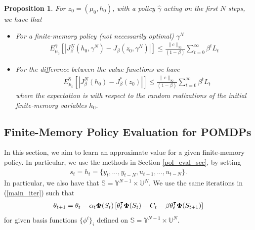 \documentclass[11pt]{article}
\newtheorem{prop}{Proposition}
\def\P{{\mathcal P}}
\begin{document}
\begin{prop}\cite[Theorem 3.3]{kara2023convergence}\label{cont_bound}
For ${z}_0=(\mu_0,h_0)$, with a policy $\hat{\gamma}$ acting on the first $N$ steps, we have that
\begin{itemize}
\item For a finite-memory policy (not necessarily optimal) $\gamma^N$
\begin{align*}
E_{\mu_0}^{\hat{\gamma}}\left[\left|J^N_\beta(h_0,\gamma^N) -J_\beta({z}_0,\gamma^N)\right|\right]\leq  \frac{\|c\|_\infty }{(1-\beta)}\sum_{t=0}^\infty\beta^tL_t
\end{align*}
\item For the difference between the value functions we have%
\begin{align*}
&E_{\mu_0}^{\hat{\gamma}}\left[\left|J^N_\beta(h_0) -J^*_\beta({z}_0)\right|\right]\leq  \frac{\|c\|_\infty }{(1-\beta)}\sum_{t=0}^\infty\beta^tL_t
\end{align*}
where the expectation is with respect to the random realizations of the initial finite-memory variables $h_0$.
\end{itemize}
\end{prop}

\subsection{Finite-Memory Policy Evaluation for POMDPs}
In this section, we aim to learn an approximate value for a given finite-memory policy. In particular, we use the methods in Section \ref{pol_eval_sec}, by setting 
\begin{align*}
s_t = h_t=\{y_t,\dots,y_{t-N},u_{t-1},\dots,u_{t-N}\}.
\end{align*}
In particular, we also have that $\mathds{S}=\mathds{Y}^{N-1}\times\mathds{U}^N$.  
We use the same iterations in (\ref{main_iter}) such that
\begin{align}\label{fin_mem_pol}
\theta_{t+1}= \theta_t - \alpha_t {\bf \Phi}(S_t) \left[\theta_t^\intercal {\bf \Phi}(S_t) - C_t - \beta \theta^\intercal_t{\bf \Phi}(S_{t+1}) \right]
\end{align}
for given basis functions $\{\phi^i\}_i$ defined on  $ \mathds{S}=\mathds{Y}^{N-1}\times\mathds{U}^N$. 
\end{document}
